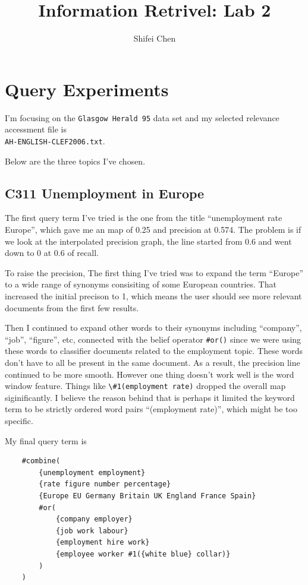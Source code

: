 \documentclass[11pt]{article} %
\title{{\LARGE Information Retrivel: Lab 2}\\[1.5mm]} %
\author{Shifei Chen} %
\begin{document}
\maketitle

\section{Query Experiments}

I'm focusing on the \verb|Glasgow Herald 95| data set and my selected relevance accessment file is \\
\verb|AH-ENGLISH-CLEF2006.txt|.

Below are the three topics I've chosen.

\subsection{C311 Unemployment in Europe}

The first query term I've tried is the one from the title ``unemployment rate Europe'', which gave me an map of 0.25 and precision at 0.574. The problem is if we look at the interpolated precision graph, the line started from 0.6 and went down to 0 at 0.6 of recall.

To raise the precision, The first thing I've tried was to expand the term ``Europe'' to a wide range of synonyms consisiting of some European countries. That increased the initial precison to 1, which means the user should see more  relevant documents from the first few results.

Then I continued to expand other words to their synonyms including ``company'', ``job'', ``figure'', etc, connected with the belief operator \verb|#or()| since we were using these words to classifier documents related to the employment topic. These words don't have to all be present in the same document. As a result, the precision line continued to be more smooth. However one thing doesn't work well is the word window feature. Things like \verb|\#1(employment rate)| dropped the overall map siginificantly. I believe the reason behind that is perhaps it limited the keyword term to be strictly ordered word pairs ``(employment rate)'', which might be too specific.

My final query term is

\begin{lstlisting}
    #combine(
        {unemployment employment}
        {rate figure number percentage}
        {Europe EU Germany Britain UK England France Spain}
        #or(
            {company employer}
            {job work labour}
            {employment hire work}
            {employee worker #1({white blue} collar)}
        )
    )
\end{lstlisting}
\end{document}
